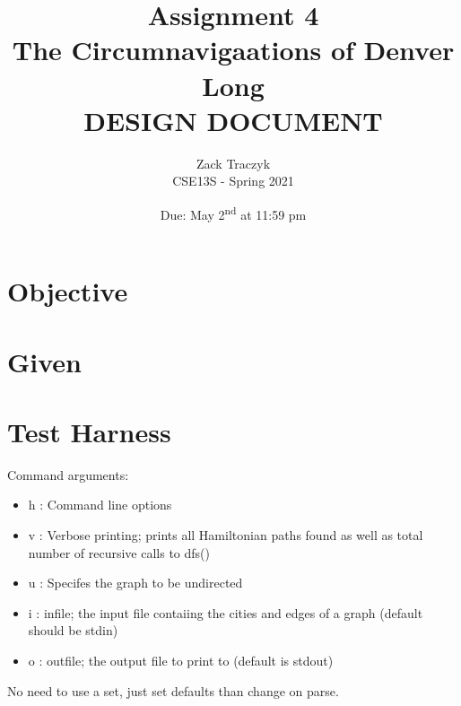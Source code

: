 \documentclass[12pt]{article}
\title{%
\textbf{Assignment 4 \\ 
The Circumnavigaations of Denver Long \\
\large DESIGN DOCUMENT} }
\author{Zack Traczyk \\ CSE13S - Spring 2021}
\date{Due: May 2\textsuperscript{nd} at 11:59 pm}
\begin{document}
    \maketitle

	\section{Objective}

	\section{Given}


	\section{Test Harness}

	Command arguments:

	\begin{itemize}
		\item{h : Command line options }
		\item{v : Verbose printing; prints all Hamiltonian paths found as well
			as total number of recursive calls to dfs()}
		\item{u : Specifes the graph to be undirected}
		\item{i : infile; the input file contaiing the cities and edges of a graph (default should be stdin)}
		\item{o : outfile; the output file to print to (default is stdout)}
	\end{itemize}

	No need to use a set, just set defaults than change on parse.

	
\end{document}
